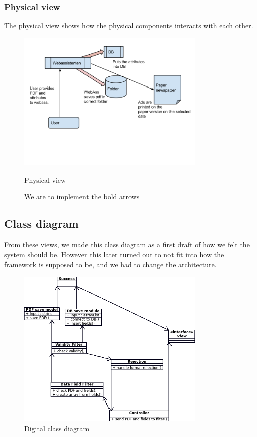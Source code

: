 \subsubsection{Physical view}
The physical view shows how the physical components interacts with each other.
\begin{figure}[H]
\centering
\includegraphics[width=0.8\textwidth]{images/architecture02.png}
\caption{Physical view}
\caption*{We are to implement the bold arrows}
\label{fig:physical_view}
\end{figure}
\newpage
\subsection{Class diagram}
From these views, we made this class diagram as a first draft of how we felt the system should be. However this later turned out to not fit into how the framework is supposed to be, and we had to change the architecture.
\begin{figure}[H]
\centering
\includegraphics[width=0.8\textwidth]{diagrams/class_diagram.png}
\caption{Digital class diagram}
\label{fig:class_diagram}
\end{figure}
